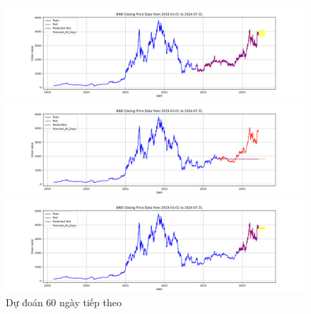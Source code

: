 \documentclass[conference]{IEEEtran}
\begin{document}
\begin{figure}[H]
    \centering
    \begin{minipage}{0.15\textwidth}
    \centering
    \includegraphics[width=1\textwidth]{Figure/RandomForest_ETH_60days_73.png}
    \end{minipage}
    \hfill
    \begin{minipage}{0.15\textwidth}
    \centering
    \includegraphics[width=1\textwidth]{Figure/ARIMA_ETH_60days_82.png}
    \end{minipage}
    \hfill
    \begin{minipage}{0.15\textwidth}
    \centering
    \includegraphics[width=1\textwidth]{Figure/RandomForest_ETH_60days_91.png}
    \end{minipage}
    \caption{Dự đoán 60 ngày tiếp theo}
    \label{fig:1}
\end{figure}
\end{document}
